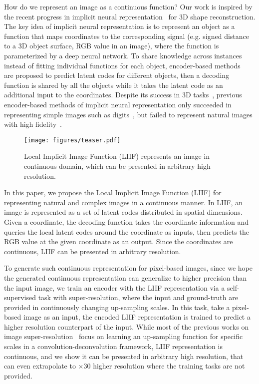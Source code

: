 \documentclass[final]{cvpr}
\begin{document}
How do we represent an image as a continuous function? Our work is inspired by the recent progress in implicit neural representation~\cite{park2019deepsdf,mescheder2019occupancy,chen2019learning,saito2019pifu,jiang2020local,sitzmann2020implicit} for 3D shape reconstruction. The key idea of implicit neural representation is to represent an object as a function that maps coordinates to the corresponding signal (e.g. signed distance to a 3D object surface, RGB value in an image), where the function is parameterized by a deep neural network. To share knowledge across instances instead of fitting individual functions for each object, encoder-based methods~\cite{mescheder2019occupancy,chen2019learning,sitzmann2020implicit} are proposed to predict latent codes for different objects, then a decoding function is shared by all the objects while it takes the latent code as an additional input to the coordinates. Despite its success in 3D tasks~\cite{saito2019pifu,saito2020pifuhd}, previous encoder-based methods of implicit neural representation only succeeded in representing simple images such as digits~\cite{chen2019learning}, but failed to represent natural images with high fidelity~\cite{sitzmann2020implicit}.

\begin{figure}
    \centering
    \texttt{[image: figures/teaser.pdf]}
    \caption{Local Implicit Image Function (LIIF) represents an image in continuous domain, which can be presented in arbitrary high resolution.}
\label{fig:teaser}
\end{figure}

In this paper, we propose the Local Implicit Image Function (LIIF) for representing natural and complex images in a continuous manner. In LIIF, an image is represented as a set of latent codes distributed in spatial dimensions. Given a coordinate, the decoding function takes the coordinate information and queries the local latent codes around the coordinate as inputs, then predicts the RGB value at the given coordinate as an output. Since the coordinates are continuous, LIIF can be presented in arbitrary resolution.

To generate such continuous representation for pixel-based images, since we hope the generated continuous representation can generalize to higher precision than the input image, we train an encoder with the LIIF representation via a self-supervised task with super-resolution, where the input and ground-truth are provided in continuously changing up-sampling scales. In this task, take a pixel-based image as an input, the encoded LIIF representation is trained to predict a higher resolution counterpart of the input. While most of the previous works on image super-resolution~\cite{dong2015image,ledig2017photo,lim2017enhanced,lai2017deep} focus on learning an up-sampling function for specific scales in a convolution-deconvolution framework, LIIF representation is continuous, and we show it can be presented in arbitrary high resolution, that can even extrapolate to $\times 30$ higher resolution where the training tasks are not provided.
\end{document}
